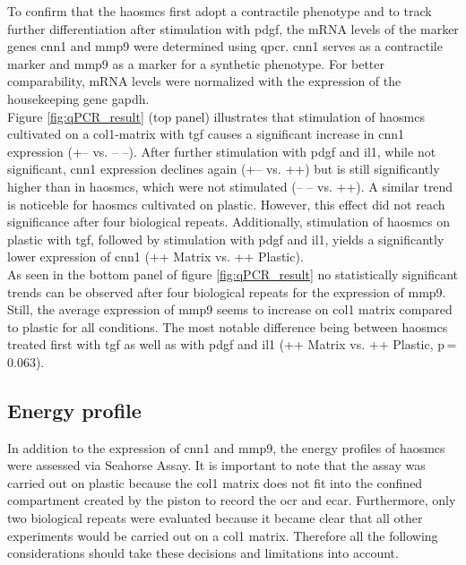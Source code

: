    To confirm that the \acp{haosmc} first adopt a contractile phenotype and to track further differentiation after stimulation with \ac{pdgf}, the \ac{mRNA} levels of the marker genes \ac{cnn1} and \ac{mmp9} were determined using \ac{qpcr}. \ac{cnn1} serves as a contractile marker and \ac{mmp9} as a marker for a synthetic phenotype. For better comparability, \ac{mRNA} levels were normalized with the expression of the housekeeping gene \ac{gapdh}.\\
    Figure \ref{fig:qPCR_result} (top panel) illustrates that stimulation of \acp{haosmc} cultivated on a \ac{col1}-matrix with \ac{tgf} causes a significant increase in \ac{cnn1} expression (+– vs. – –). After further stimulation with \ac{pdgf} and \ac{il1}, while not significant, \ac{cnn1} expression declines again (+– vs. ++) but is still significantly higher than in \acp{haosmc}, which were not stimulated (– – vs. ++). A similar trend is noticeble for \acp{haosmc} cultivated on plastic. However, this effect did not reach significance after four biological repeats. Additionally, stimulation of \acp{haosmc} on plastic with \ac{tgf}, followed by stimulation with \ac{pdgf} and \ac{il1}, yields a significantly lower expression of \ac{cnn1} (++ Matrix vs. ++ Plastic).\\
    As seen in the bottom panel of figure \ref{fig:qPCR_result} no statistically significant trends can be observed after four biological repeats for the expression of \ac{mmp9}. Still, the average expression of \ac{mmp9} seems to increase on \ac{col1} matrix compared to plastic for all conditions. The most notable difference being between \acp{haosmc} treated first with \ac{tgf} as well as with \ac{pdgf} and \ac{il1} (++ Matrix vs. ++ Plastic, p\,=\,0.063).


    \subsection{Energy profile}
    \label{subsec:energy}
    In addition to the expression of \ac{cnn1} and \ac{mmp9}, the energy profiles of \acp{haosmc} were assessed via Seahorse Assay. It is important to note that the assay was carried out on plastic because the \ac{col1} matrix does not fit into the confined compartment created by the piston to record the \ac{ocr} and \ac{ecar}. Furthermore, only two biological repeats were evaluated because it became clear that all other experiments would be carried out on a \ac{col1} matrix. Therefore all the following considerations should take these decisions and limitations into account.

